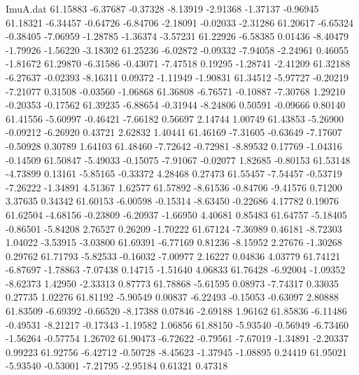 \begin{filecontents}{ImuA.dat}
  61.15883   -6.37687   -0.37328   -8.13919   -2.91368   -1.37137   -0.96945
  61.18321   -6.34457   -0.64726   -6.84706   -2.18091   -0.02033   -2.31286
  61.20617   -6.65324   -0.38405   -7.06959   -1.28785   -1.36374   -3.57231
  61.22926   -6.58385    0.01436   -8.40479   -1.79926   -1.56220   -3.18302
  61.25236   -6.02872   -0.09332   -7.94058   -2.24961    0.46055   -1.81672
  61.29870   -6.31586   -0.43071   -7.47518    0.19295   -1.28741   -2.41209
  61.32188   -6.27637   -0.02393   -8.16311    0.09372   -1.11949   -1.90831
  61.34512   -5.97727   -0.20219   -7.21077    0.31508   -0.03560   -1.06868
  61.36808   -6.76571   -0.10887   -7.30768    1.29210   -0.20353   -0.17562
  61.39235   -6.88654   -0.31944   -8.24806    0.50591   -0.09666    0.80140
  61.41556   -5.60997   -0.46421   -7.66182    0.56697    2.14744    1.00749
  61.43853   -5.26900   -0.09212   -6.26920    0.43721    2.62832    1.40441
  61.46169   -7.31605   -0.63649   -7.17607   -0.50928    0.30789    1.64103
  61.48460   -7.72642   -0.72981   -8.89532    0.17769   -1.04316   -0.14509
  61.50847   -5.49033   -0.15075   -7.91067   -0.02077    1.82685   -0.80153
  61.53148   -4.73899    0.13161   -5.85165   -0.33372    4.28468    0.27473
  61.55457   -7.54457   -0.53719   -7.26222   -1.34891    4.51367    1.62577
  61.57892   -8.61536   -0.84706   -9.41576    0.71200    3.37635    0.34342
  61.60153   -6.00598   -0.15314   -8.63450   -0.22686    4.17782    0.19076
  61.62504   -4.68156   -0.23809   -6.20937   -1.66950    4.40681    0.85483
  61.64757   -5.18405   -0.86501   -5.84208    2.76527    0.26209   -1.70222
  61.67124   -7.36989    0.46181   -8.72303    1.04022   -3.53915   -3.03800
  61.69391   -6.77169    0.81236   -8.15952    2.27676   -1.30268    0.29762
  61.71793   -5.82533   -0.16032   -7.00977    2.16227    0.04836    4.03779
  61.74121   -6.87697   -1.78863   -7.07438    0.14715   -1.51640    4.06833
  61.76428   -6.92004   -1.09352   -8.62373    1.42950   -2.33313    0.87773
  61.78868   -5.61595    0.08973   -7.74317    0.33035    0.27735    1.02276
  61.81192   -5.90549    0.00837   -6.22493   -0.15053   -0.63097    2.80888
  61.83509   -6.69392   -0.66520   -8.17388    0.07846   -2.69188    1.96162
  61.85836   -6.11486   -0.49531   -8.21217   -0.17343   -1.19582    1.06856
  61.88150   -5.93540   -0.56949   -6.73460   -1.56264   -0.57754    1.26702
  61.90473   -6.72622   -0.79561   -7.67019   -1.34891   -2.20337    0.99223
  61.92756   -6.42712   -0.50728   -8.45623   -1.37945   -1.08895    0.24419
  61.95021   -5.93540   -0.53001   -7.21795   -2.95184    0.61321    0.47318

\end{filecontents}
